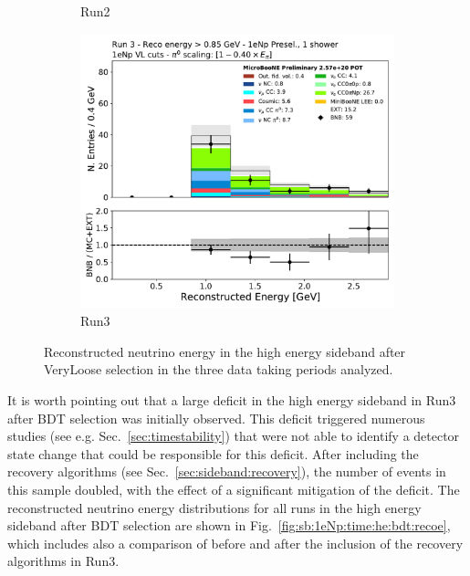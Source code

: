 \begin{figure}[H]
\begin{center}
\begin{subfigure}{0.32\textwidth}
    \caption{Run2}
    \end{subfigure}
    \begin{subfigure}{0.32\textwidth}
    \includegraphics[width=1.00\textwidth]{Sidebands/Figures/1eNp/TimeDependence/reco_e_coarse_HE_NPVL_Run3.pdf}
    \caption{Run3}
    \end{subfigure}
    \caption{\label{fig:sb:1eNp:time:he:vl:recoe} Reconstructed neutrino energy in the \npsel high energy sideband after VeryLoose selection in the three data taking periods analyzed.}
    \end{center}
\end{figure}

It is worth pointing out that a large deficit in the high energy sideband in Run3 after BDT selection was initially observed. This deficit triggered numerous studies (see e.g. Sec.~\ref{sec:timestability}) that were not able to identify a detector state change that could be responsible for this deficit. After including the recovery algorithms (see Sec.~\ref{sec:sideband:recovery}), the number of events in this sample doubled, with the effect of a significant mitigation of the deficit. The reconstructed neutrino energy distributions for all runs in the high energy \npsel sideband after BDT selection are shown in Fig.~\ref{fig:sb:1eNp:time:he:bdt:recoe}, which includes also a comparison of before and after the inclusion of the recovery algorithms in Run3.

